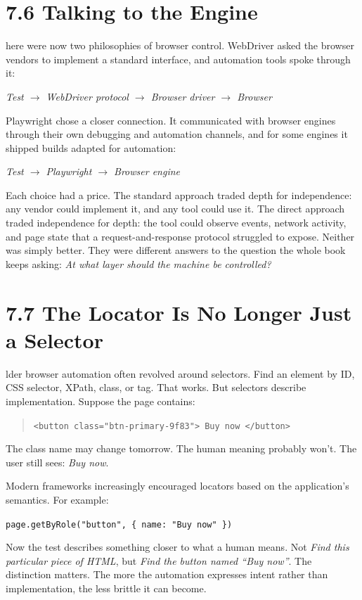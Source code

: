 \documentclass[11pt, a4paper, openany]{book}
\newcommand{\initialcap}[1]{{\fontfamily{lmss}\selectfont\huge\textbf{#1}}}
\begin{document}
\section{7.6 Talking to the Engine}
\noindent \initialcap{T}here were now two philosophies of browser control. WebDriver asked the browser vendors to implement a standard interface, and automation tools spoke through it:
\begin{center}
\textit{Test $\rightarrow$ WebDriver protocol $\rightarrow$ Browser driver $\rightarrow$ Browser}
\end{center}
Playwright chose a closer connection. It communicated with browser engines through their own debugging and automation channels, and for some engines it shipped builds adapted for automation:
\begin{center}
\textit{Test $\rightarrow$ Playwright $\rightarrow$ Browser engine}
\end{center}
Each choice had a price. The standard approach traded depth for independence: any vendor could implement it, and any tool could use it. The direct approach traded independence for depth: the tool could observe events, network activity, and page state that a request-and-response protocol struggled to expose. Neither was simply better. They were different answers to the question the whole book keeps asking: \textit{At what layer should the machine be controlled?}

\section{7.7 The Locator Is No Longer Just a Selector}
\noindent \initialcap{O}lder browser automation often revolved around selectors. Find an element by ID, CSS selector, XPath, class, or tag. That works. But selectors describe implementation. Suppose the page contains:
\begin{quote}
\texttt{<button class="btn-primary-9f83"> Buy now </button>}
\end{quote}
The class name may change tomorrow. The human meaning probably won't. The user still sees: \textit{Buy now}. 

Modern frameworks increasingly encouraged locators based on the application's semantics. For example:
\begin{center}
\texttt{page.getByRole("button", \{ name: "Buy now" \})}
\end{center}
Now the test describes something closer to what a human means. Not \textit{Find this particular piece of HTML}, but \textit{Find the button named ``Buy now''}. The distinction matters. The more the automation expresses intent rather than implementation, the less brittle it can become.
\end{document}
